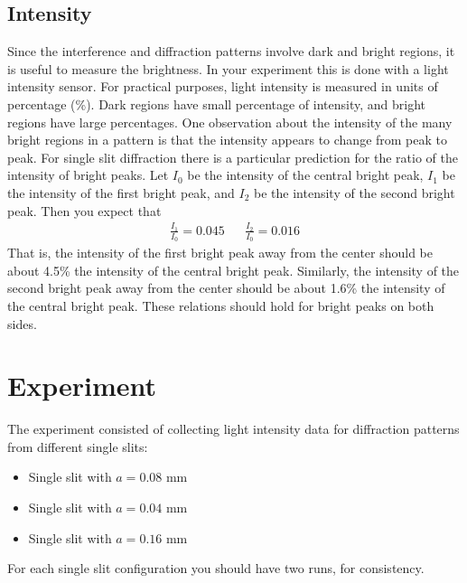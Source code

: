 \subsection{Intensity}
Since the interference and diffraction patterns involve dark and bright regions, it is useful to measure the brightness. In your experiment this is done with a light intensity sensor. For practical purposes, light intensity is measured in units of percentage (\%). Dark regions have small percentage of intensity, and bright regions have large percentages. One observation about the intensity of the many bright regions in a pattern is that the intensity appears to change from peak to peak. For single slit diffraction there is a particular prediction for the ratio of the intensity of bright peaks. Let $I_{0}$ be the intensity of the central bright peak, $I_{1}$ be the intensity of the first bright peak, and $I_{2}$ be the intensity of the second bright peak. Then you expect that
\begin{align}
    \frac{I_{1}}{I_{0}} = 0.045 && \frac{I_{2}}{I_{0}} = 0.016
\end{align}
That is, the intensity of the first bright peak away from the center should be about 4.5\% the intensity of the central bright peak. Similarly, the intensity of the second bright peak away from the center should be about 1.6\% the intensity of the central bright peak. These relations should hold for bright peaks on both sides.
\section{Experiment}
The experiment consisted of collecting light intensity data for diffraction patterns from different single slits:
\begin{itemize}
    \item Single slit with $a = 0.08$ mm
    \item Single slit with $a = 0.04$ mm
    \item Single slit with $a = 0.16$ mm
\end{itemize}
For each single slit configuration you should have two runs, for consistency.
